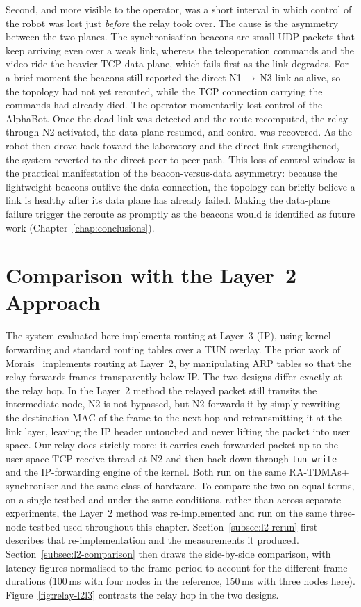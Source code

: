 Second, and more visible to the operator, was a short interval in which control
of the robot was lost just \emph{before} the relay took over. The cause is the
asymmetry between the two planes. The synchronisation beacons are small UDP
packets that keep arriving even over a weak link, whereas the teleoperation
commands and the video ride the heavier TCP data plane, which fails first as the
link degrades. For a brief moment the beacons still reported the direct
N1\,$\to$\,N3 link as alive, so the topology had not yet rerouted, while the TCP
connection carrying the commands had already died. The operator momentarily lost
control of the AlphaBot. Once the dead link was detected and the route
recomputed, the relay through N2 activated, the data plane resumed, and control
was recovered. As the robot then drove back toward the laboratory and the direct
link strengthened, the system reverted to the direct peer-to-peer path. This
loss-of-control window is the practical manifestation of the beacon-versus-data
asymmetry: because the lightweight beacons outlive the data connection, the
topology can briefly believe a link is healthy after its data plane has already
failed. Making the data-plane failure trigger the reroute as promptly as the
beacons would is identified as future work
(Chapter~\ref{chap:conclusions}).


\section{Comparison with the Layer~2 Approach}
\label{sec:comparison}

The system evaluated here implements routing at Layer~3 (IP), using kernel
forwarding and standard routing tables over a TUN overlay. The prior work of
Morais~\cite{morais2024synchronization} implements routing at Layer~2, by
manipulating ARP tables so that the relay forwards frames transparently below
IP. The two designs differ exactly at the relay hop. In the Layer~2 method the relayed packet
still transits the intermediate node, N2 is not bypassed, but N2 forwards it by
simply rewriting the destination MAC of the frame to the next hop and retransmitting
it at the link layer, leaving the IP header untouched and never lifting the
packet into user space. Our relay does strictly more: it carries each forwarded
packet up to the user-space TCP receive thread at N2 and then back down through
\texttt{tun\_write} and the IP-forwarding engine of the kernel. Both run on the same
RA-TDMAs+ synchroniser and the same class of hardware. To compare the two on equal terms, on a single testbed and under the
same conditions, rather than across separate experiments, the Layer~2 method
was re-implemented and run on the same three-node testbed used throughout this
chapter. Section~\ref{subsec:l2-rerun} first describes that re-implementation
and the measurements it produced. Section~\ref{subsec:l2-comparison} then draws
the side-by-side comparison, with latency figures normalised to the frame
period to account for the different frame durations (100\,ms with four nodes in
the reference, 150\,ms with three nodes here).
Figure~\ref{fig:relay-l2l3} contrasts the relay hop in the two designs.

